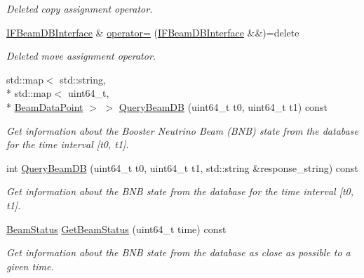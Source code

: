 \begin{DoxyCompactItemize}
\begin{DoxyCompactList}\small\item\em Deleted copy assignment operator. \end{DoxyCompactList}\item 
\hypertarget{classIFBeamDBInterface_adbdd5916724ed8747b0e6ca705e07184}{\hyperlink{classIFBeamDBInterface}{I\-F\-Beam\-D\-B\-Interface} \& \hyperlink{classIFBeamDBInterface_adbdd5916724ed8747b0e6ca705e07184}{operator=} (\hyperlink{classIFBeamDBInterface}{I\-F\-Beam\-D\-B\-Interface} \&\&)=delete}\label{classIFBeamDBInterface_adbdd5916724ed8747b0e6ca705e07184}

\begin{DoxyCompactList}\small\item\em Deleted move assignment operator. \end{DoxyCompactList}\item 
std\-::map$<$ std\-::string, \\*
std\-::map$<$ uint64\-\_\-t, \\*
\hyperlink{structBeamDataPoint}{Beam\-Data\-Point} $>$ $>$ \hyperlink{classIFBeamDBInterface_a7b0e4c42767791f1904540b63772a74d}{Query\-Beam\-D\-B} (uint64\-\_\-t t0, uint64\-\_\-t t1) const 
\begin{DoxyCompactList}\small\item\em Get information about the Booster Neutrino Beam (B\-N\-B) state from the database for the time interval \mbox{[}t0, t1\mbox{]}. \end{DoxyCompactList}\item 
int \hyperlink{classIFBeamDBInterface_a034ef023cb78989270a4ec2d54a5aa4f}{Query\-Beam\-D\-B} (uint64\-\_\-t t0, uint64\-\_\-t t1, std\-::string \&response\-\_\-string) const 
\begin{DoxyCompactList}\small\item\em Get information about the B\-N\-B state from the database for the time interval \mbox{[}t0, t1\mbox{]}. \end{DoxyCompactList}\item 
\hyperlink{classBeamStatus}{Beam\-Status} \hyperlink{classIFBeamDBInterface_add525c53cbf0b85c3cd0d39a5b9b0fdd}{Get\-Beam\-Status} (uint64\-\_\-t time) const 
\begin{DoxyCompactList}\small\item\em Get information about the B\-N\-B state from the database as close as possible to a given time. \end{DoxyCompactList}\end{DoxyCompactItemize}
